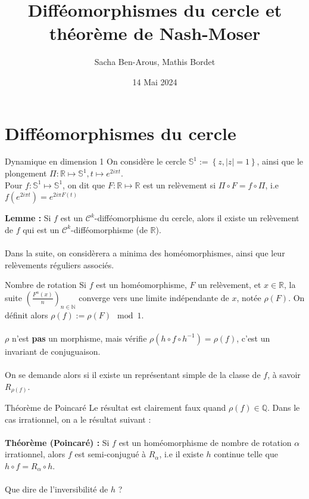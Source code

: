 \documentclass[10pt]{beamer}
\title{Difféomorphismes du cercle et théorème de Nash-Moser}
\date{14 Mai 2024}
\author{Sacha Ben-Arous, Mathis Bordet}
\institute{ENS Paris-Saclay}
\begin{document}
  \maketitle
\begin{frame}
\tableofcontents
\end{frame}  



\section{Difféomorphismes du cercle}
\begin{frame}{Dynamique en dimension 1}
    On considère le cercle $\mathbb{S}^1 := \left\{z, |z|=1 \right\}$, ainsi que le plongement $\Pi : \mathbb{R} \mapsto \mathbb{S}^1, t \mapsto e^{2i\pi t}$. \\
    
Pour $f:\mathbb{S}^1 \mapsto \mathbb{S}^1$, on dit que $F: \mathbb{R} \mapsto \mathbb{R}$ est un relèvement si $\Pi \circ F = f \circ \Pi$, i.e $f(e^{2i\pi t}) = e^{2i\pi F(t)}$

\textbf{Lemme :} Si $f$ est un $\mathcal{C}^k$-difféomorphisme du cercle, alors il existe un relèvement de $f$ qui est un $\mathcal{C}^k$-difféomorphisme (de $\mathbb{R}$). \\~\\

Dans la suite, on considèrera a minima des homéomorphismes, ainsi que leur relèvements réguliers associés.
\end{frame}

\begin{frame}{Nombre de rotation}
    Si $f$ est un homéomorphisme, $F$ un relèvement, et $x\in \mathbb{R}$, la suite $\displaystyle (\frac{F^n(x)}{n})_{n\in \mathbb{N}}$ converge vers une limite indépendante de $x$, notée $\rho(F)$. On définit alors $\rho(f):= \rho(F) \mod 1$. \\~\\
    
$\rho$ n'est \textbf{pas} un morphisme, mais vérifie $\rho(h\circ f \circ h^{-1}) = \rho(f)$, c'est un invariant de conjuguaison. \\~\\

On se demande alors si il existe un représentant simple de la classe de $f$, à savoir $R_{\rho(f)}$.
\end{frame}



\begin{frame}{Théorème de Poincaré}
Le résultat est clairement faux quand $\rho(f) \in \mathbb{Q}$. Dans le cas irrationnel, on a le résultat suivant : \\~\\

\textbf{Théorème (Poincaré) :} Si $f$ est un homéomorphisme de nombre de rotation $\alpha$ irrationnel, alors $f$ est semi-conjugué à $R_\alpha$, i.e il existe $h$ continue telle que $h \circ f = R_\alpha \circ h$. \\~\\

Que dire de l'inversibilité de $h$ ?
\end{frame}
\end{document}

